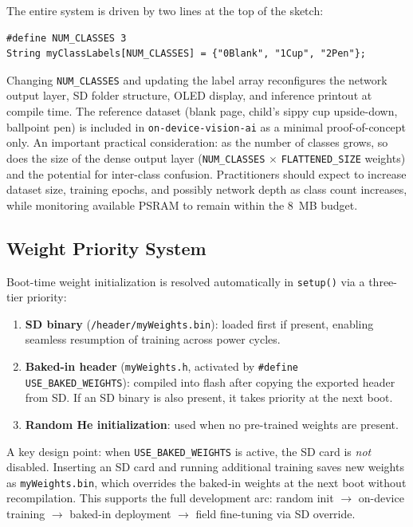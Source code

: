 \documentclass[12pt]{article}
\begin{document}
The entire system is driven by two lines at the top of the sketch:

\begin{lstlisting}[caption={Configuring class count and names (Part~0).}]
#define NUM_CLASSES 3
String myClassLabels[NUM_CLASSES] = {"0Blank", "1Cup", "2Pen"};
\end{lstlisting}

Changing \texttt{NUM\_CLASSES} and updating the label array reconfigures the
network output layer, SD folder structure, OLED display, and inference printout
at compile time.
The reference dataset (blank page, child's sippy cup upside-down, ballpoint pen)
is included in \texttt{on-device-vision-ai} as a minimal proof-of-concept only.
An important practical consideration: as the number of classes grows, so does
the size of the dense output layer
(\texttt{NUM\_CLASSES} $\times$ \texttt{FLATTENED\_SIZE} weights) and the
potential for inter-class confusion.
Practitioners should expect to increase dataset size, training epochs, and
possibly network depth as class count increases, while monitoring available
PSRAM to remain within the 8~MB budget.

\subsection{Weight Priority System}
\label{subsec:weights}

Boot-time weight initialization is resolved automatically in \texttt{setup()}
via a three-tier priority:

\begin{enumerate}
  \item \textbf{SD binary} (\texttt{/header/myWeights.bin}): loaded first if
        present, enabling seamless resumption of training across power cycles.
  \item \textbf{Baked-in header} (\texttt{myWeights.h}, activated by
        \texttt{\#define USE\_BAKED\_WEIGHTS}): compiled into flash after
        copying the exported header from SD.
        If an SD binary is also present, it takes priority at the next boot.
  \item \textbf{Random He initialization}: used when no pre-trained weights
        are present.
\end{enumerate}

A key design point: when \texttt{USE\_BAKED\_WEIGHTS} is active, the SD card
is \emph{not} disabled.
Inserting an SD card and running additional training saves new weights as
\texttt{myWeights.bin}, which overrides the baked-in weights at the next boot
without recompilation.
This supports the full development arc: random init $\to$ on-device training
$\to$ baked-in deployment $\to$ field fine-tuning via SD override.
\end{document}
